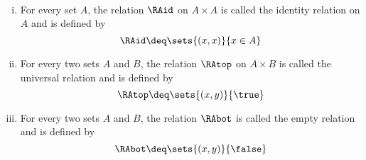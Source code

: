 \begin{definition}
\label{def:topidbot}~ 
	\begin{enumerate}[(i)]
		\item For every set $A$, the relation $\RAid$ on $A \times A$ is called the identity relation on $A$ and is defined by
			\begin{equation*}
				\RAid \deq \sets{(x,x)}{x \in A}
			\end{equation*}
		\item For every two sets $A$ and $B$, the relation $\RAtop$ on $A \times B$ is called the universal relation and is defined by
			\begin{equation*}
				\RAtop \deq \sets{(x,y)}{\true} 
			\end{equation*}
		\item For every two sets $A$ and $B$, the relation $\RAbot$ is called the empty relation and is defined by
			\begin{equation*}
				\RAbot \deq \sets{(x,y)}{\false}
			\end{equation*}
	\end{enumerate}
\end{definition}